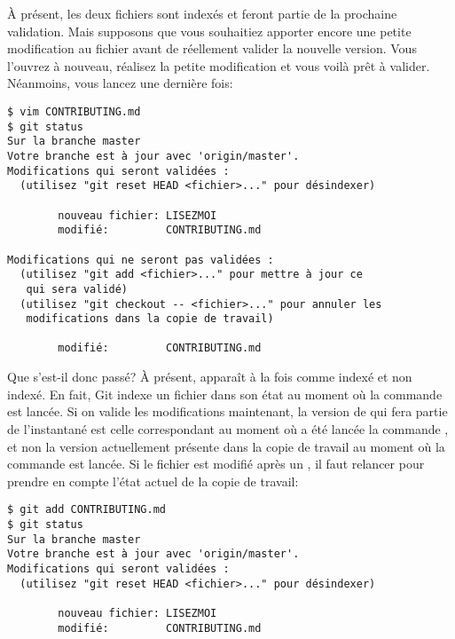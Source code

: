 À présent, les deux fichiers sont indexés et feront partie de la prochaine validation.
Mais supposons que vous souhaitiez apporter encore une petite modification au fichier  avant de réellement valider la nouvelle version.
Vous l'ouvrez à nouveau, réalisez la petite modification et vous voilà prêt à valider.
Néanmoins, vous lancez  une dernière fois:
\begin{Schunk}
\begin{Verbatim}
$ vim CONTRIBUTING.md
$ git status
Sur la branche master
Votre branche est à jour avec 'origin/master'.
Modifications qui seront validées :
  (utilisez "git reset HEAD <fichier>..." pour désindexer)

        nouveau fichier: LISEZMOI
        modifié:         CONTRIBUTING.md

Modifications qui ne seront pas validées :
  (utilisez "git add <fichier>..." pour mettre à jour ce
   qui sera validé)
  (utilisez "git checkout -- <fichier>..." pour annuler les
   modifications dans la copie de travail)

        modifié:         CONTRIBUTING.md
\end{Verbatim}
\end{Schunk}

Que s'est-il donc passé?
À présent,  apparaît à la fois comme indexé et non indexé.
En fait, Git indexe un fichier dans son état au moment où la commande  est lancée.
Si on valide les modifications maintenant, la version de  qui fera partie de l'instantané est celle correspondant au moment où a été lancée la commande , et non la version actuellement présente dans la copie de travail au moment où la commande  est lancée.
Si le fichier est modifié après un , il faut relancer  pour prendre en compte l'état actuel de la copie de travail:
\begin{Schunk}
\begin{Verbatim}
$ git add CONTRIBUTING.md
$ git status
Sur la branche master
Votre branche est à jour avec 'origin/master'.
Modifications qui seront validées :
  (utilisez "git reset HEAD <fichier>..." pour désindexer)

        nouveau fichier: LISEZMOI
        modifié:         CONTRIBUTING.md

\end{Verbatim}
\end{Schunk}

